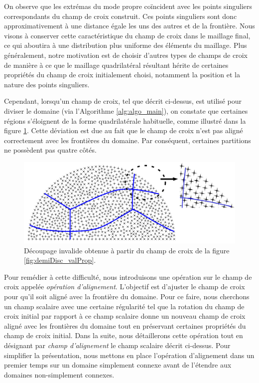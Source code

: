 On observe que les extrémas du mode propre coïncident avec les points singuliers correspondants du champ de croix construit. Ces points singuliers sont donc approximativement à une distance égale les uns des autres et de la frontière. Nous visons à conserver cette caractéristique du champ de croix dans le maillage final, ce qui aboutira à une distribution plus uniforme des éléments du maillage. Plus généralement, notre motivation est de choisir d'autres types de champs de croix de manière à ce que le maillage quadrilatéral résultant hérite de certaines propriétés du champ de croix initialement choisi, notamment la position et la nature des points singuliers.

Cependant, lorsqu'un champ de croix, tel que décrit ci-dessus, est utilisé pour diviser le domaine (via l'Algorithme \ref{alg:algo_main}), on constate que certaines régions s'éloignent de la forme quadrilatérale habituelle, comme illustré dans la figure \ref{fig:demiDisc_valProp_mauvaix_decoup}. Cette déviation est due au fait que le champ de croix n'est pas aligné correctement avec les frontières du domaine. Par conséquent, certaines partitions ne possèdent pas quatre côtés.

\begin{figure}[!h]
\centering
\includegraphics[scale=0.8]{images/gagaga.pdf}
\caption{Découpage invalide obtenue à partir du champ de croix de la figure \ref{fig:demiDisc_valProp}.}
\label{fig:demiDisc_valProp_mauvaix_decoup}
\end{figure}


Pour remédier à cette difficulté, nous introduisons une opération sur le champ de croix appelée \emph{opération d'alignement}. L'objectif est d'ajuster le champ de croix pour qu'il soit aligné avec la frontière du domaine. Pour ce faire, nous cherchons un champ scalaire avec une certaine régularité tel que la rotation du champ de croix initial par rapport à ce champ scalaire donne un nouveau champ de croix aligné avec les frontières du domaine tout en préservant certaines propriétés du champ de croix initial. Dans la suite, nous détaillerons cette opération tout en désignant par \emph{champ d'alignement} le champ scalaire décrit ci-dessus. Pour simplifier la présentation, nous mettons en place l'opération d'alignement dans un premier temps sur un domaine simplement connexe avant de l'étendre aux domaines non-simplement connexes.

